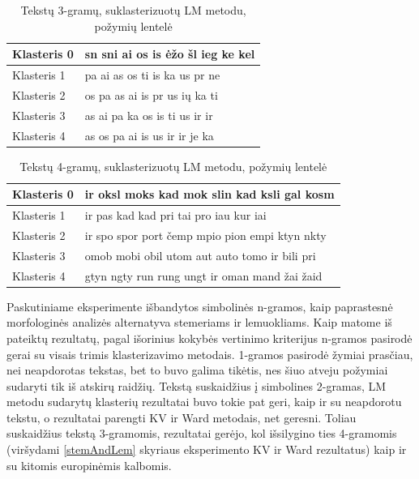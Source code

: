 \documentclass{VUMIFInfBakalaurinis}
\begin{document}
\begin{table}[H]
  \centering
  \caption{Tekstų 3-gramų, suklasterizuotų LM metodu, požymių lentelė}
  \small
  \begin{tabular}{|l|l|}
  \hline
  Klasteris 0 & sn sni ai os is ėžo šl ieg ke kel \\ \hline
  Klasteris 1 & pa ai as os ti is ka us pr ne     \\ \hline
  Klasteris 2 & os pa as ai is pr us ių ka ti     \\ \hline
  Klasteris 3 & as ai pa ka os is ti us ir ir     \\ \hline
  Klasteris 4 & as os pa ai is us ir ir je ka     \\ \hline
  \end{tabular}
  \normalsize
\end{table}

\begin{table}[H]
  \centering
  \caption{Tekstų 4-gramų, suklasterizuotų LM metodu, požymių lentelė}
  \small
  \begin{tabular}{|l|l|}
  \hline
  Klasteris 0 & ir oksl moks kad mok slin kad ksli gal kosm    \\ \hline
  Klasteris 1 & ir pas kad kad pri tai pro iau kur iai         \\ \hline
  Klasteris 2 & ir spo spor port čemp mpio pion empi ktyn nkty \\ \hline
  Klasteris 3 & omob mobi obil utom aut auto tomo ir bili pri  \\ \hline
  Klasteris 4 & gtyn ngty run rung ungt ir oman mand žai žaid  \\ \hline
  \end{tabular}
  \normalsize
\end{table}

Paskutiniame eksperimente išbandytos simbolinės n-gramos, kaip
paprastesnė morfologinės analizės alternatyva stemeriams ir lemuokliams.
Kaip matome iš pateiktų rezultatų, pagal išorinius kokybės vertinimo kriterijus n-gramos
pasirodė gerai su visais trimis klasterizavimo metodais. 1-gramos
pasirodė žymiai prasčiau, nei neapdorotas tekstas, bet to buvo galima
tikėtis, nes šiuo atveju požymiai sudaryti tik iš atskirų raidžių.
Tekstą suskaidžius į simbolines 2-gramas, LM metodu sudarytų klasterių
rezultatai buvo tokie pat geri, kaip ir su neapdorotu tekstu, o
rezultatai parengti KV ir Ward metodais, net geresni. Toliau suskaidžius
tekstą 3-gramomis, rezultatai gerėjo, kol išsilygino ties 4-gramomis
(viršydami \ref{stemAndLem} skyriaus eksperimento KV ir Ward rezultatus) kaip ir su
kitomis europinėmis kalbomis.%
\end{document}
